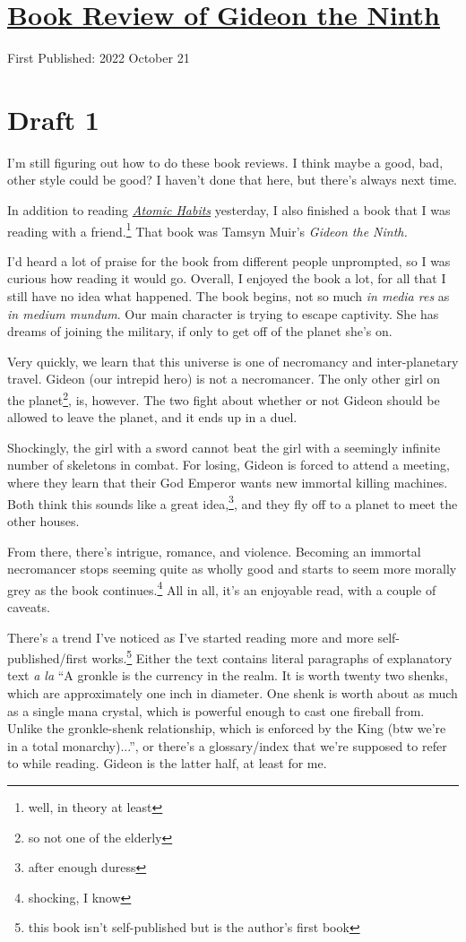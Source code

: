 \documentclass[12pt]{article}[titlepage]
\newcommand{\say}[1]{``#1''}
\newcommand{\1}{\={a}}
\newcommand{\2}{\={e}}
\newcommand{\3}{\={\i}}
\newcommand{\4}{\=o}
\newcommand{\5}{\=u}
\newcommand{\6}{\={A}}
\renewcommand{\,}{\textsuperscript{,}}
\begin{document}
\doublespacing
\section{\href{book-review-gideon-ninth.html}{Book Review of Gideon the Ninth}}
First Published: 2022 October 21
\section{Draft 1}
I'm still figuring out how to do these book reviews.
I think maybe a good, bad, other style could be good?
I haven't done that here, but there's always next time.

In addition to reading \href{book-review-atomic-habits.html}{\textit{Atomic Habits}} yesterday, I also finished a book that I was reading with a friend.\footnote{well, in theory at least}
That book was Tamsyn Muir's \textit{Gideon the Ninth.}

I'd heard a lot of praise for the book from different people unprompted, so I was curious how reading it would go.
Overall, I enjoyed the book a lot, for all that I still have no idea what happened.
The book begins, not so much \textit{in media res} as \textit{in medium mundum}.
Our main character is trying to escape captivity.
She has dreams of joining the military, if only to get off of the planet she's on.

Very quickly, we learn that this universe is one of necromancy and inter-planetary travel.
Gideon (our intrepid hero) is not a necromancer.
The only other girl on the planet\footnote{so not one of the elderly}, is, however.
The two fight about whether or not Gideon should be allowed to leave the planet, and it ends up in a duel.

Shockingly, the girl with a sword cannot beat the girl with a seemingly infinite number of skeletons in combat.
For losing, Gideon is forced to attend a meeting, where they learn that their God Emperor wants new immortal killing machines.
Both think this sounds like a great idea,\footnote{after enough duress}, and they fly off to a planet to meet the other houses.

From there, there's intrigue, romance, and violence.
Becoming an immortal necromancer stops seeming quite as wholly good and starts to seem more morally grey as the book continues.\footnote{shocking, I know}
All in all, it's an enjoyable read, with a couple of caveats.

There's a trend I've noticed as I've started reading more and more self-published/first works.\footnote{this book isn't self-published but is the author's first book}
Either the text contains literal paragraphs of explanatory text \textit{a la} \say{A gronkle is the currency in the realm. It is worth twenty two shenks, which are approximately one inch in diameter. One shenk is worth about as much as a single mana crystal, which is powerful enough to cast one fireball from. Unlike the gronkle-shenk relationship, which is enforced by the King (btw we're in a total monarchy)...}, or there's a glossary/index that we're supposed to refer to while reading.
Gideon is the latter half, at least for me.
\end{document}
